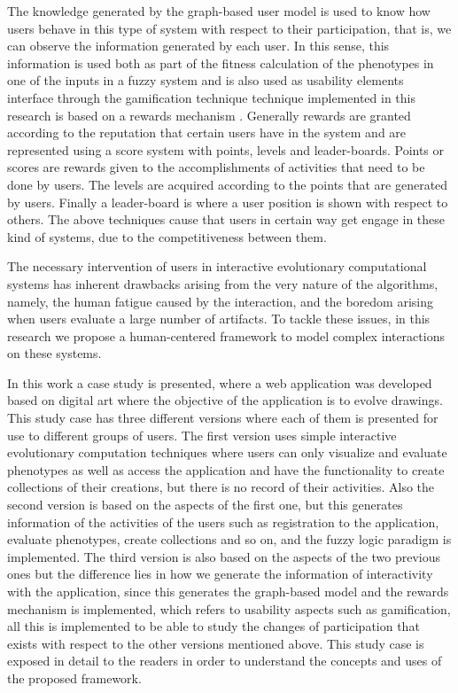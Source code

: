 \par The knowledge generated by the graph-based user model is used to know how users
behave in this type of system with respect to their participation, that is, we
can observe the information generated by each user. In this sense, this
information is used both as part of the fitness calculation of the phenotypes in
one of the inputs in a fuzzy system and is also used as usability elements
interface through the gamification technique\cite{huotari2012defining}\cite{deterding2011game}\cite{hickman2010total}\cite{mcgonigal2011reality} technique
implemented in this research is based on a rewards mechanism \cite{sutter2010browse}.
Generally rewards are granted according to the reputation that certain users
have in the system and are represented using a score system with points, levels and
leader-boards. Points or scores are rewards given to the accomplishments of
activities that need to be done by users. The levels are acquired according to
the points that are generated by users. Finally a leader-board is where a user position
is shown with respect to others. The above
techniques cause that users in certain way get engage in these kind of
systems, due to the competitiveness between them.


\par The necessary intervention of users in interactive evolutionary computational
systems has inherent drawbacks arising from the very nature of the algorithms,
namely, the human fatigue caused by the interaction, and the boredom arising
when users evaluate a large number of artifacts. To tackle these issues, in this
research we propose a human-centered framework to model complex interactions on
these systems.

\par In this work a case study is presented, where a web application was
developed based on digital art where the objective of the application is to
evolve drawings. This study case has three different versions where each of them
is presented for use to different groups of users. The first version uses simple
interactive evolutionary computation techniques where users can only visualize
and evaluate phenotypes as well as access the application and have the
functionality to create collections of their creations, but there is no record
of their activities. Also the second version is based on the aspects of the
first one, but this generates information of the activities of the users such as
registration to the application, evaluate phenotypes, create collections and so
on, and the fuzzy logic paradigm is implemented. The third version is also
based on the aspects of the two previous ones but the difference lies in how we
generate the information of interactivity with the application, since this
generates the graph-based model and the rewards mechanism is implemented, which
refers to usability aspects such as gamification, all this is implemented to be
able to study the changes of participation that exists with respect to the other
versions mentioned above. This study case is exposed in detail to the readers in
order to understand the concepts and uses of the proposed framework.



